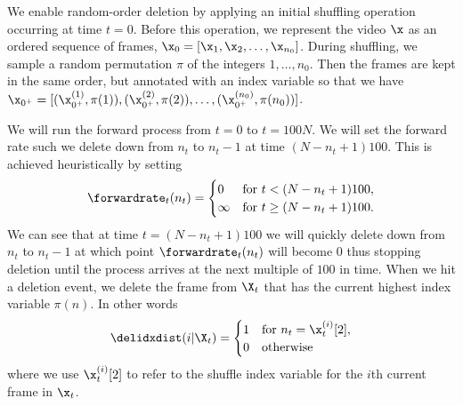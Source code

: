 We enable random-order deletion by applying an initial shuffling operation occurring at time $t=0$. Before this operation, we represent the video $\x$ as an ordered sequence of frames, $\x_0=[\x_1,\x_2,\ldots,\x_{n_0}]$. During shuffling, we sample a random permutation $\pi$ of the integers $1,\ldots,n_0$. Then the frames are kept in the same order, but annotated with an index variable so that we have $\x_{0^+}=[(\x_{0^+}^{(1)}, \pi(1)), (\x_{0^+}^{(2)}, \pi(2)), \ldots, (\x^{(n_0)}_{0^+}, \pi(n_0))]$.

We will run the forward process from $t=0$ to $t = 100N$. We will set the forward rate such we delete down from $n_t$ to $n_t - 1$ at time $(N-n_t+1)100$. This is achieved heuristically by setting
\begin{equation}
    \forwardrate_t(n_t) = \begin{cases}
        0 & \text{for } t < (N-n_t+1)100, \\
        \infty & \text{for }  t \geq (N-n_t + 1) 100.
    \end{cases} 
\end{equation}
We can see that at time $t = (N - n_t + 1)100$ we will quickly delete down from $n_t$ to $n_t-1$ at which point $\forwardrate_t(n_t)$ will become $0$ thus stopping deletion until the process arrives at the next multiple of $100$ in time. When we hit a deletion event, we delete the frame from $\X_t$ that has the current highest index variable $\pi(n)$. In other words
\begin{equation}
    \delidxdist(i | \X_t) = \begin{cases}
        1 & \text{for } n_t = \x_{t}^{(i)}[2], \\
        0 & \text{otherwise}
    \end{cases}    
\end{equation}
where we use $\x_{t}^{(i)}[2]$ to refer to the shuffle index variable for the $i$th current frame in $\x_{t}$.


